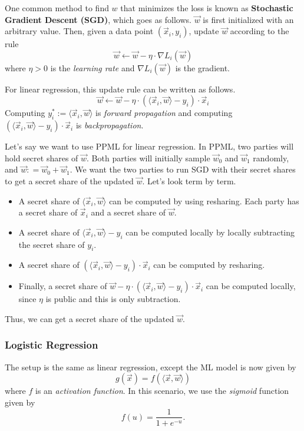 One common method to find $w$ that minimizes the loss is known as \textbf{Stochastic Gradient Descent (SGD)}, which goes as follows. $\vec{w}$ is first initialized with an arbitrary value. Then, given a data point $(\vec{x}_i, y_i)$, update $\vec{w}$ according to the rule
$$\vec{w} \gets \vec{w} - \eta \cdot \nabla L_i(\vec{w})$$
where $\eta > 0$ is the \textit{learning rate} and $\nabla L_i(\vec{w})$ is the gradient.

For linear regression, this update rule can be written as follows.
$$\vec{w} \gets \vec{w} - \eta \cdot (\langle \vec{x}_i, \vec{w}\rangle - y_i)\cdot \vec{x}_i$$
Computing $y_i^*:= \langle \vec{x}_i, \vec{w}\rangle$ is \textit{forward propagation} and computing $(\langle \vec{x}_i, \vec{w}\rangle - y_i)\cdot \vec{x}_i$ is \textit{backpropagation}.

Let's say we want to use PPML for linear regression. In PPML, two parties will hold secret shares of $\vec{w}$. Both parties will initially sample $\vec{w}_0$ and $\vec{w}_1$ randomly, and $\vec{w}: = \vec{w}_0 + \vec{w}_1$. We want the two parties to run SGD with their secret shares to get a secret share of the updated $\vec{w}$. Let's look term by term.

\begin{itemize}
    \item A secret share of $\langle \vec{x}_i, \vec{w}\rangle$ can be computed by using resharing. Each party has a secret share of $\vec{x}_i$ and a secret share of $\vec{w}$.
    \item A secret share of $\langle \vec{x}_i, \vec{w}\rangle - y_i$ can be computed locally by locally subtracting the secret share of $y_i$.
    \item A secret share of $(\langle \vec{x}_i, \vec{w}\rangle - y_i)\cdot \vec{x}_i$ can be computed by resharing.
    \item Finally, a secret share of $\vec{w} - \eta \cdot (\langle \vec{x}_i, \vec{w}\rangle - y_i)\cdot \vec{x}_i$ can be computed locally, since $\eta$ is public and this is only subtraction.
\end{itemize}

Thus, we can get a secret share of the updated $\vec{w}$.

\subsubsection{Logistic Regression}

The setup is the same as linear regression, except the ML model is now given by
$$g(\vec{x}) = f(\langle \vec{x}, \vec{w}\rangle)$$
where $f$ is an \textit{activation function}. In this scenario, we use the \textit{sigmoid} function given by
$$f(u) = \frac{1}{1 + e^{-u}}.$$

